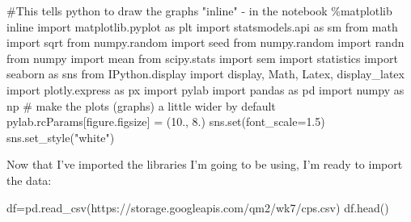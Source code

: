 \documentclass[
  letterpaper,
  DIV=11,
  numbers=noendperiod]{scrreprt}
\newenvironment{Shaded}{\begin{snugshade}}{\end{snugshade}}
\newcommand{\BuiltInTok}[1]{\textcolor[rgb]{0.00,0.23,0.31}{#1}}
\newcommand{\CommentTok}[1]{\textcolor[rgb]{0.37,0.37,0.37}{#1}}
\newcommand{\FloatTok}[1]{\textcolor[rgb]{0.68,0.00,0.00}{#1}}
\newcommand{\ImportTok}[1]{\textcolor[rgb]{0.00,0.46,0.62}{#1}}
\newcommand{\NormalTok}[1]{\textcolor[rgb]{0.00,0.23,0.31}{#1}}
\newcommand{\OperatorTok}[1]{\textcolor[rgb]{0.37,0.37,0.37}{#1}}
\newcommand{\StringTok}[1]{\textcolor[rgb]{0.13,0.47,0.30}{#1}}
\begin{document}
\begin{Shaded}
\begin{Highlighting}[]
\CommentTok{\#This tells python to draw the graphs "inline" {-} in the notebook}
\OperatorTok{\%}\NormalTok{matplotlib inline  }
\ImportTok{import}\NormalTok{ matplotlib.pyplot }\ImportTok{as}\NormalTok{ plt}
\ImportTok{import}\NormalTok{ statsmodels.api }\ImportTok{as}\NormalTok{ sm}
\ImportTok{from}\NormalTok{ math }\ImportTok{import}\NormalTok{ sqrt}
\ImportTok{from}\NormalTok{ numpy.random }\ImportTok{import}\NormalTok{ seed}
\ImportTok{from}\NormalTok{ numpy.random }\ImportTok{import}\NormalTok{ randn}
\ImportTok{from}\NormalTok{ numpy }\ImportTok{import}\NormalTok{ mean}
\ImportTok{from}\NormalTok{ scipy.stats }\ImportTok{import}\NormalTok{ sem}
\ImportTok{import}\NormalTok{ statistics }
\ImportTok{import}\NormalTok{ seaborn }\ImportTok{as}\NormalTok{ sns}
\ImportTok{from}\NormalTok{ IPython.display }\ImportTok{import}\NormalTok{ display, Math, Latex, display\_latex}
\ImportTok{import}\NormalTok{ plotly.express }\ImportTok{as}\NormalTok{ px}
\ImportTok{import}\NormalTok{ pylab}
\ImportTok{import}\NormalTok{ pandas }\ImportTok{as}\NormalTok{ pd}
\ImportTok{import}\NormalTok{ numpy }\ImportTok{as}\NormalTok{ np}
\CommentTok{\# make the plots (graphs) a little wider by default}
\NormalTok{pylab.rcParams[}\StringTok{\textquotesingle{}figure.figsize\textquotesingle{}}\NormalTok{] }\OperatorTok{=}\NormalTok{ (}\FloatTok{10.}\NormalTok{, }\FloatTok{8.}\NormalTok{)}
\NormalTok{sns.}\BuiltInTok{set}\NormalTok{(font\_scale}\OperatorTok{=}\FloatTok{1.5}\NormalTok{)}
\NormalTok{sns.set\_style(}\StringTok{"white"}\NormalTok{)}

\end{Highlighting}
\end{Shaded}

Now that I've imported the libraries I'm going to be using, I'm ready to
import the data:

\begin{Shaded}
\begin{Highlighting}[]
\NormalTok{df}\OperatorTok{=}\NormalTok{pd.read\_csv(}\StringTok{\textquotesingle{}https://storage.googleapis.com/qm2/wk7/cps.csv\textquotesingle{}}\NormalTok{)}
\NormalTok{df.head()}
\end{Highlighting}
\end{Shaded}
\end{document}
